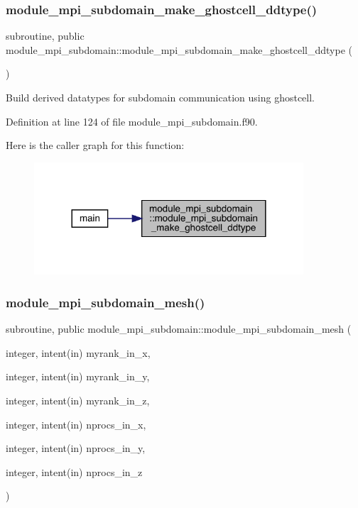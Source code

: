 \subsubsection{\texorpdfstring{module\_mpi\_subdomain\_make\_ghostcell\_ddtype()}{module\_mpi\_subdomain\_make\_ghostcell\_ddtype()}}
{\footnotesize\ttfamily subroutine, public module\+\_\+mpi\+\_\+subdomain\+::module\+\_\+mpi\+\_\+subdomain\+\_\+make\+\_\+ghostcell\+\_\+ddtype (\begin{DoxyParamCaption}{ }\end{DoxyParamCaption})}



Build derived datatypes for subdomain communication using ghostcell. 



Definition at line 124 of file module\+\_\+mpi\+\_\+subdomain.\+f90.

Here is the caller graph for this function\+:\nopagebreak
\begin{figure}[H]
\begin{center}
\leavevmode
\includegraphics[width=284pt]{namespacemodule__mpi__subdomain_a108c65cb0e549fd286b43243a6406ec9_icgraph}
\end{center}
\end{figure}
\mbox{\label{namespacemodule__mpi__subdomain_a73f1a66627a730c3906f200d9d31f974}} 
\subsubsection{\texorpdfstring{module\_mpi\_subdomain\_mesh()}{module\_mpi\_subdomain\_mesh()}}
{\footnotesize\ttfamily subroutine, public module\+\_\+mpi\+\_\+subdomain\+::module\+\_\+mpi\+\_\+subdomain\+\_\+mesh (\begin{DoxyParamCaption}\item[{integer, intent(in)}]{myrank\+\_\+in\+\_\+x,  }\item[{integer, intent(in)}]{myrank\+\_\+in\+\_\+y,  }\item[{integer, intent(in)}]{myrank\+\_\+in\+\_\+z,  }\item[{integer, intent(in)}]{nprocs\+\_\+in\+\_\+x,  }\item[{integer, intent(in)}]{nprocs\+\_\+in\+\_\+y,  }\item[{integer, intent(in)}]{nprocs\+\_\+in\+\_\+z }\end{DoxyParamCaption})}



